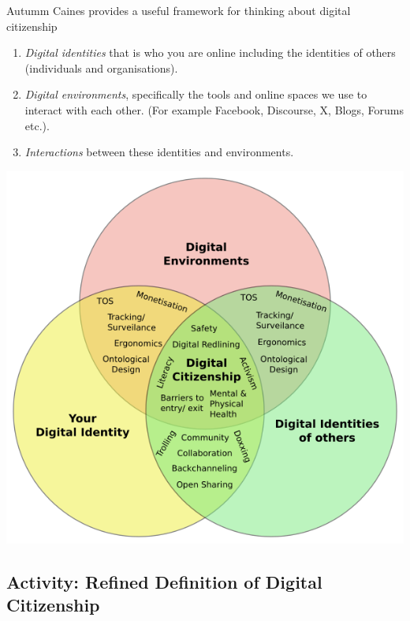 \documentclass[
]{book}
\providecommand{\tightlist}{%
  \setlength{\itemsep}{0pt}\setlength{\parskip}{0pt}}
\theoremstyle{definition}
\theoremstyle{definition}
\theoremstyle{definition}
\theoremstyle{definition}
\theoremstyle{remark}
\begin{document}
Autumm Caines provides a useful framework for thinking about digital citizenship

\begin{enumerate}
\def\labelenumi{\arabic{enumi}.}
\tightlist
\item
  \emph{Digital identities} that is who you are online including the identities of others (individuals and organisations).\\
\item
  \emph{Digital environments}, specifically the tools and online spaces we use to interact with each other. (For example Facebook, Discourse, X, Blogs, Forums etc.).\\
\item
  \emph{Interactions} between these identities and environments.
\end{enumerate}

\includegraphics{assets/u5/Digital_citizenship_Venn.png}

\hypertarget{activity-refined-definition-of-digital-citizenship}{%
\subsection*{Activity: Refined Definition of Digital Citizenship}\label{activity-refined-definition-of-digital-citizenship}}
\end{document}
